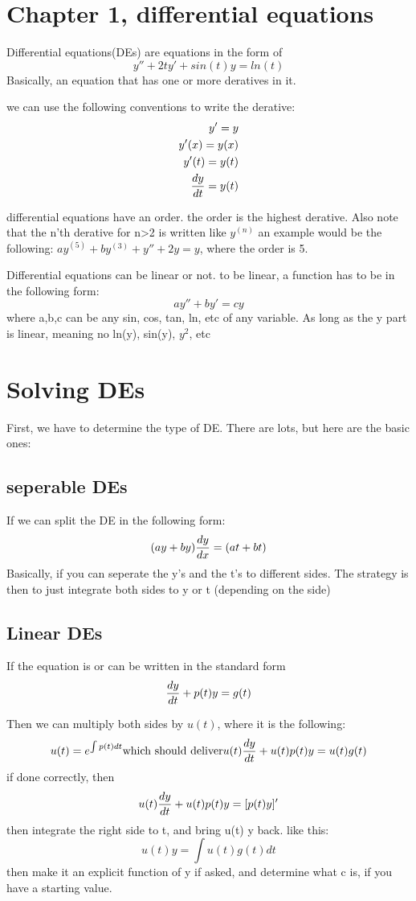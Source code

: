 \documentclass[17pt]{extarticle} %
\begin{document}
\newcommand\abs[1]{\left|#1\right|} %
\newcommand{\seq}[2][0]{\left\{ #2 \right\}_{n=#1}}
\newtheorem{theorem}{Theorem}
\newtheorem*{theorem*}{Theorem}
\newtheorem*{definition}{Definition}

\section{Chapter 1, differential equations}

Differential equations(DEs) are equations in the form of 
$$
y'' + 2ty' + sin(t)y = ln(t)
$$
Basically, an equation that has one or more deratives in it.

we can use the following conventions to write the derative:
$$
\begin{aligned}
    y' = y \\
y'(x) = y(x) \\
y'(t) = y(t) \\
{dy\over dt} = y(t)
\end{aligned}
$$

differential equations have an order. the order is the highest derative.
Also note that the n'th derative for n>2 is written like $y^{(n)}$
an example would be the following:
$a y^{(5)} + b y^{(3)} + y'' + 2y = y$, where the order is 5.

Differential equations can be linear or not. 
to be linear, a function has to be in the following form: 
$$
ay'' + by' = cy
$$
where a,b,c can be any sin, cos, tan, ln, etc of any variable. As long as the y part is linear, meaning no
ln(y), sin(y), $y^2$, etc

\newpage
\section{Solving DEs}
First, we have to determine the type of DE. There are lots, but here are the basic ones:

\subsection{seperable DEs}
If we can split the DE in the following form:
$$
(ay + by ){dy \over dx} = (at + bt)
$$
Basically, if you can seperate the y's and the t's to different sides.
The strategy is then to just integrate both sides to  y or t (depending on the side)

\subsection{Linear DEs}
If the equation is or can be written in the standard form 
$$
{dy\over dt} + p(t) y= g(t)
$$

Then we can multiply both sides by $u(t)$, where it is the following:
$$
u(t) = e^{\int p(t)dt} \\
\text{which should deliver} \\
u(t) {dy\over dt} + u(t) p(t) y = u(t) g(t)
$$
if done correctly, then 
$$
u(t) {dy\over dt} + u(t) p(t) y = [p(t) y]'
$$
then integrate the right side to t, and bring u(t) y back. 
like this:
$$
u(t) y = \int u(t) g(t) dt
$$
then make it an explicit function of y if asked, and determine what c is, if you have a starting value.
\end{document}
